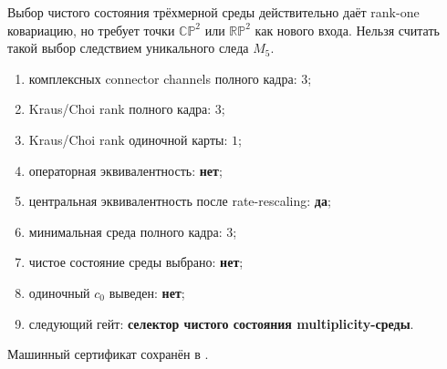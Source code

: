 \begin{nogocriterion}
Выбор чистого состояния трёхмерной среды действительно даёт rank-one
ковариацию, но требует точки $\mathbb{CP}^2$ или $\mathbb{RP}^2$ как нового
входа. Нельзя считать такой выбор следствием уникального следа $M_5$.
\end{nogocriterion}

\begin{protocol}\begin{enumerate}
\item комплексных connector channels полного кадра: \textbf{$3$};
\item Kraus/Choi rank полного кадра: \textbf{$3$};
\item Kraus/Choi rank одиночной карты: \textbf{$1$};
\item операторная эквивалентность: \textbf{нет};
\item центральная эквивалентность после rate-rescaling: \textbf{да};
\item минимальная среда полного кадра: \textbf{$3$};
\item чистое состояние среды выбрано: \textbf{нет};
\item одиночный $c_0$ выведен: \textbf{нет};
\item следующий гейт: \textbf{селектор чистого состояния multiplicity-среды}.
\end{enumerate}\end{protocol}

Машинный сертификат сохранён в
.
